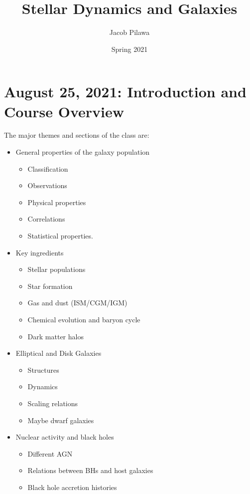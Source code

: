 \documentclass{article}
\title{Stellar Dynamics and Galaxies}
\author{Jacob Pilawa}
\date{Spring 2021}
\begin{document}
\maketitle
\tableofcontents
\newpage

\section{August 25, 2021: Introduction and Course Overview}

The major themes and sections of the class are:

\begin{itemize}
    \item General properties of the galaxy population
    \begin{itemize}
        \item Classification
        \item Observations
        \item Physical properties
        \item Correlations
        \item Statistical properties. 
    \end{itemize}
    \item Key ingredients
    \begin{itemize}
        \item Stellar populations
        \item Star formation
        \item Gas and dust (ISM/CGM/IGM)
        \item Chemical evolution and baryon cycle
        \item Dark matter halos
    \end{itemize}
    \item Elliptical and Disk Galaxies
    \begin{itemize}
        \item Structures
        \item Dynamics
        \item Scaling relations
        \item Maybe dwarf galaxies
    \end{itemize}
    \item Nuclear activity and black holes
    \begin{itemize}
        \item Different AGN
        \item Relations between BHs and host galaxies
        \item Black hole accretion histories

\end{itemize}
\end{itemize}
\end{document}
